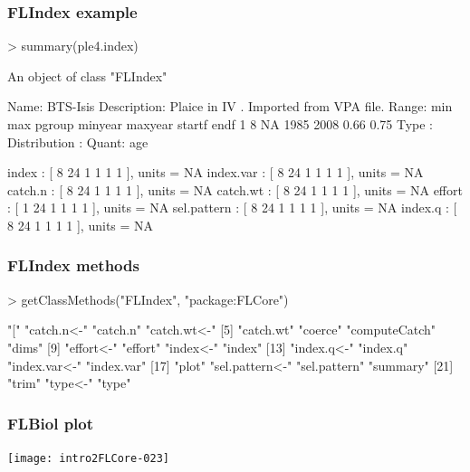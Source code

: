 \documentclass{beamer}%
\begin{document}
\begin{frame}[containsverbatim]
  \frametitle{FLIndex example}
{\tiny{
\begin{Schunk}
\begin{Sinput}
> summary(ple4.index)
\end{Sinput}
\begin{Soutput}
An object of class "FLIndex"

Name: BTS-Isis 
Description: Plaice in IV . Imported from VPA file. 
Range:	 min	max	pgroup	minyear	maxyear	startf	endf 
	1	8	NA	1985	2008	0.66	0.75	
Type :   
Distribution :   
Quant: age 

index         : [ 8 24 1 1 1 1 ], units =  NA 
index.var     : [ 8 24 1 1 1 1 ], units =  NA 
catch.n       : [ 8 24 1 1 1 1 ], units =  NA 
catch.wt      : [ 8 24 1 1 1 1 ], units =  NA 
effort        : [ 1 24 1 1 1 1 ], units =  NA 
sel.pattern   : [ 8 24 1 1 1 1 ], units =  NA 
index.q       : [ 8 24 1 1 1 1 ], units =  NA 
\end{Soutput}
\end{Schunk}
}}
\end{frame}

\begin{frame}[containsverbatim]
  \frametitle{FLIndex methods}

{\tiny{
\begin{Schunk}
\begin{Sinput}
> getClassMethods("FLIndex", "package:FLCore")
\end{Sinput}
\begin{Soutput}
 [1] "["             "catch.n<-"     "catch.n"       "catch.wt<-"   
 [5] "catch.wt"      "coerce"        "computeCatch"  "dims"         
 [9] "effort<-"      "effort"        "index<-"       "index"        
[13] "index.q<-"     "index.q"       "index.var<-"   "index.var"    
[17] "plot"          "sel.pattern<-" "sel.pattern"   "summary"      
[21] "trim"          "type<-"        "type"         
\end{Soutput}
\end{Schunk}
}}

\end{frame}

\begin{frame}
  \frametitle{FLBiol plot}

\texttt{[image: intro2FLCore-023]}

\end{frame}
\end{document}
